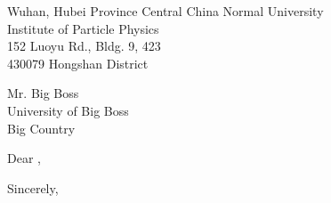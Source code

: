 \documentclass[a4paper,11pt]{letter}
\begin{document}
\date{\today}
\address {P. R. of China}
         {Wuhan, Hubei Province}
         {
            Central China Normal University\\
            Institute of Particle Physics\\
            152 Luoyu Rd., Bldg. 9, 423\\
            430079 Hongshan District
         }

\begin{letter}{
    Mr. Big Boss\\
    University of Big Boss\\
    Big Country
}

\opening{Dear \toname,}

\fontsample
\closing{Sincerely,}
\end{letter}
\end{document}
